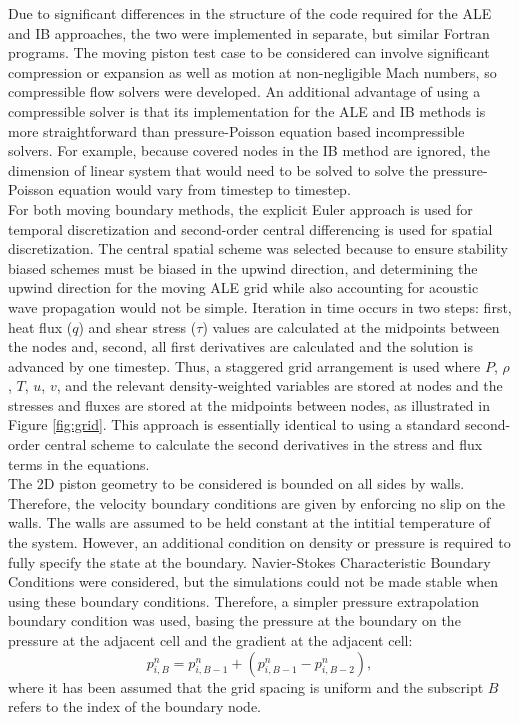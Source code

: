 \documentclass{article}
\begin{document}
Due to significant differences in the structure of the code required for the ALE and IB approaches, the two were implemented in separate, but similar Fortran programs. The moving piston test case to be considered can involve significant compression or expansion as well as motion at non-negligible Mach numbers, so compressible flow solvers were developed. An additional advantage of using a compressible solver is that its implementation for the ALE and IB methods is more straightforward than pressure-Poisson equation based incompressible solvers. For example, because covered nodes in the IB method are ignored, the dimension of linear system that would need to be solved to solve the pressure-Poisson equation would vary from timestep to timestep. \\

For both moving boundary methods, the explicit Euler approach is used for temporal discretization and second-order central differencing is used for spatial discretization. The central spatial scheme was selected because to ensure stability biased schemes must be biased in the upwind direction, and determining the upwind direction for the moving ALE grid while also accounting for acoustic wave propagation would not be simple. Iteration in time occurs in two steps: first, heat flux ($q$) and shear stress ($\tau$) values are calculated at the midpoints between the nodes and, second, all first derivatives are calculated and the solution is advanced by one timestep. Thus, a staggered grid arrangement is used where $P$, $\rho$, $T$, $u$, $v$, and the relevant density-weighted variables are stored at nodes and the stresses and fluxes are stored at the midpoints between nodes, as illustrated in Figure \ref{fig:grid}. This approach is essentially identical to using a standard second-order central scheme to calculate the second derivatives in the stress and flux terms in the equations. \\

The 2D piston geometry to be considered is bounded on all sides by walls. Therefore, the velocity boundary conditions are given by enforcing no slip on the walls. The walls are assumed to be held constant at the intitial temperature of the system. However, an additional condition on density or pressure is required to fully specify the state at the boundary. Navier-Stokes Characteristic Boundary Conditions \cite{} were considered, but the simulations could not be made stable when using these boundary conditions. Therefore, a simpler pressure extrapolation boundary condition was used, basing the pressure at the boundary on the pressure at the adjacent cell and the gradient at the adjacent cell:
\begin{equation}
p^n_{i,B} = p^n_{i,B-1} + (p^n_{i,B-1} - p^n_{i,B-2}),
\end{equation}
where it has been assumed that the grid spacing is uniform and the subscript $B$ refers to the index of the boundary node.
\end{document}
